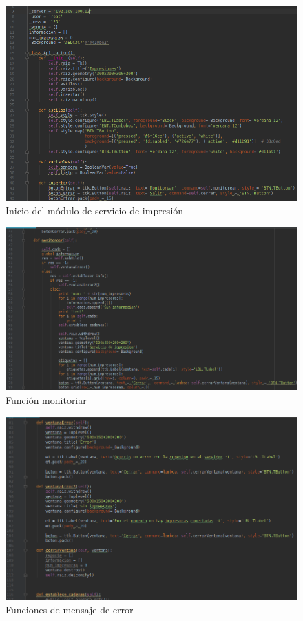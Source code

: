 \FloatBarrier
\begin{figure}[htbp!]
		\centering
			\includegraphics[width=.9\textwidth]{images/s1}
		\caption{Inicio del módulo de servicio de impresión}
		\label{image:s1}
\end{figure}
\FloatBarrier

\FloatBarrier
\begin{figure}[htbp!]
		\centering
			\includegraphics[width=.9\textwidth]{images/s2}
		\caption{Función monitoriar}
		\label{image:s2}
\end{figure}
\FloatBarrier

\FloatBarrier
\begin{figure}[htbp!]
		\centering
			\includegraphics[width=.9\textwidth]{images/s3}
		\caption{Funciones de mensaje de error}
		\label{image:s3}
\end{figure}
\FloatBarrier

